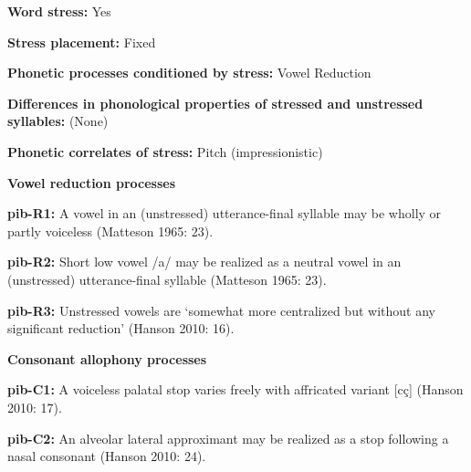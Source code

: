 \begin{styleBody}
\textbf{Word stress:} Yes
\end{styleBody}

\begin{styleBody}
\textbf{Stress placement:} Fixed
\end{styleBody}

\begin{styleBody}
\textbf{Phonetic processes conditioned by stress:} Vowel Reduction
\end{styleBody}

\begin{styleBody}
\textbf{Differences in phonological properties of stressed and unstressed syllables:} (None)
\end{styleBody}

\begin{styleBody}
\textbf{Phonetic correlates of stress: }Pitch (impressionistic)
\end{styleBody}

\begin{styleBody}
\textbf{Vowel reduction processes}
\end{styleBody}

\begin{styleBody}
\textbf{pib-R1:} A vowel in an (unstressed) utterance-final syllable may be wholly or partly voiceless (Matteson 1965: 23).
\end{styleBody}

\begin{styleBody}
\textbf{pib-R2:} Short low vowel /a/ may be realized as a neutral vowel in an (unstressed) utterance-final syllable (Matteson 1965: 23).
\end{styleBody}

\begin{styleBody}
\textbf{pib-R3:} Unstressed vowels are ‘somewhat more centralized but without any significant reduction’ (Hanson 2010: 16).
\end{styleBody}

\begin{styleBody}
\textbf{Consonant allophony processes}
\end{styleBody}

\begin{styleBody}
\textbf{pib-C1: }A voiceless palatal stop varies freely with affricated variant [cç] (Hanson 2010: 17).
\end{styleBody}

\begin{styleBody}
\textbf{pib-C2: }An alveolar lateral approximant may be realized as a stop following a nasal consonant (Hanson 2010: 24).
\end{styleBody}

